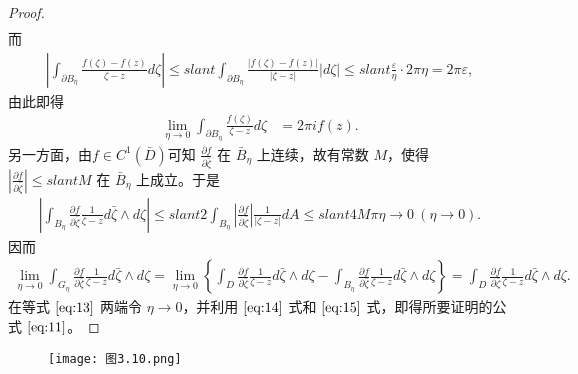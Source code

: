 \documentclass[../../main.tex]{subfiles}
\begin{document}
\begin{proof}
\begin{align*}
\end{align*}
而
\begin{align*}
\left| \int_{\partial B_\eta} \frac{f(\zeta) - f(z)}{\zeta - z} d\zeta \right| \leqslant slant \int_{\partial B_\eta} \frac{|f(\zeta) - f(z)|}{|\zeta - z|} |d\zeta| \leqslant slant \frac{\varepsilon}{\eta} \cdot 2\pi \eta = 2\pi \varepsilon,
\end{align*}
由此即得
\begin{align}
\lim_{\eta \to 0} \int_{\partial B_\eta} \frac{f(\zeta)}{\zeta - z} d\zeta &= 2\pi i f(z). \label{eq:14}
\end{align}
另一方面，由\( f \in C^1(\bar{D}) \)可知 \( \frac{\partial f}{\partial \bar{\zeta}} \) 在 \( \bar{B}_\eta \) 上连续，故有常数 \( M \)，使得 \( \left| \frac{\partial f}{\partial \bar{\zeta}} \right| \leqslant slant M \) 在 \( \bar{B}_\eta \) 上成立。于是
\begin{align*}
\left| \int_{B_\eta} \frac{\partial f}{\partial \bar{\zeta}} \frac{1}{\zeta - z} d\bar{\zeta} \wedge d\zeta \right| \leqslant slant 2 \int_{B_\eta} \left| \frac{\partial f}{\partial \bar{\zeta}} \right| \frac{1}{|\zeta - z|} dA \leqslant slant 4M \pi \eta \to 0 \ (\eta \to 0).
\end{align*}
因而
\begin{align}
\lim_{\eta \to 0} \int_{G_\eta} \frac{\partial f}{\partial \bar{\zeta}} \frac{1}{\zeta - z} d\bar{\zeta} \wedge d\zeta = \lim_{\eta \to 0} \left\{ \int_D \frac{\partial f}{\partial \bar{\zeta}} \frac{1}{\zeta - z} d\bar{\zeta} \wedge d\zeta - \int_{B_\eta} \frac{\partial f}{\partial \bar{\zeta}} \frac{1}{\zeta - z} d\bar{\zeta} \wedge d\zeta \right\} = \int_D \frac{\partial f}{\partial \bar{\zeta}} \frac{1}{\zeta - z} d\bar{\zeta} \wedge d\zeta. \label{eq:15}
\end{align}
在等式 \(\eqref{eq:13}\) 两端令 \( \eta \to 0 \)，并利用 \(\eqref{eq:14}\) 式和 \(\eqref{eq:15}\) 式，即得所要证明的公式 \(\eqref{eq:11}\)。
\end{proof}

\begin{figure}[H]
\centering
\texttt{[image: 图3.10.png]}
\caption{}
\label{figure:图3.10}
\end{figure}
\end{document}
